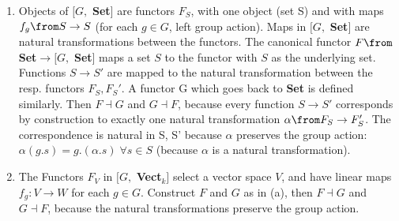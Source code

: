 \begin{answer}
\begin{enumerate}
\item Objects of $[G,$ \textbf{Set}$]$ are functors $F_S$, with one object (set S) and with maps $f_g \from S\to S$ (for each $g \in G$, left group action). Maps in  $[G,$ \textbf{Set}$]$ are natural transformations between the functors. The canonical functor $F \from$ \textbf{Set}$ \to [G,$ \textbf{Set}$]$ maps a set $S$ to the functor with $S$ as the underlying set. Functions $S\to S' $ are mapped to the natural transformation between the resp. functors $F_S, F_S'$. A functor G which goes back to \textbf{Set} is defined similarly. Then $F \dashv G$ and $G \dashv F$, because every function $S \to S'$ corresponds by construction to exactly one natural transformation $\alpha \from F_S \to F_S'$. The correspondence is natural in S, S' because $\alpha$ preserves the group action: $\alpha (g . s) = g . (\alpha . s)\; \forall s \in S$ (because $\alpha$ is a natural transformation).

\item The Functors $F_V$ in  $[G,$ \textbf{Vect}$_k]$ select a vector space $V$, and have linear maps $f_g: V \to W$ for each $g \in G$. Construct $F$ and $G$ as in (a), then  $F \dashv G$ and $G \dashv F$, because the natural transformations preserve the group action.
\end{enumerate}
\end{answer}



